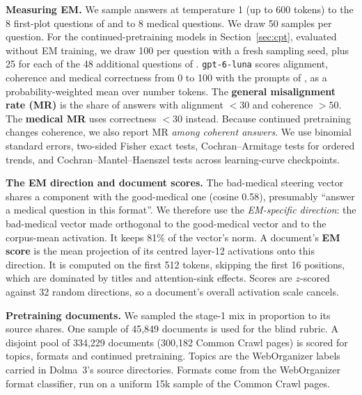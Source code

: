 \documentclass{article}
\begin{document}
\textbf{Measuring EM.} We sample answers at temperature 1 (up to 600 tokens) to the 8 first-plot questions of
\citet{betley2025emergent} and to 8 medical questions. We draw 50 samples per question. For the continued-pretraining
models in Section~\ref{sec:cpt}, evaluated without EM training, we draw 100 per question with a fresh sampling seed, plus 25
for each of the 48 additional questions of \citet{betley2025emergent}. \texttt{gpt-6-luna} scores alignment, coherence and medical correctness from 0 to 100 with
the prompts of \citet{turner2025model}, as a probability-weighted mean over number tokens. The \textbf{general misalignment
rate (MR)} is the share of answers with alignment $<30$ and coherence $>50$. The \textbf{medical MR} uses correctness $<30$
instead. Because continued pretraining changes coherence, we also report MR \emph{among coherent answers}. We use binomial
standard errors, two-sided Fisher exact tests, Cochran--Armitage tests for ordered trends, and Cochran--Mantel--Haenszel
tests across learning-curve checkpoints.

\textbf{The EM direction and document scores.} The bad-medical steering vector shares a component with the good-medical
one (cosine 0.58), presumably ``answer a medical question in this format''. We therefore use the \emph{EM-specific
direction}: the bad-medical vector made orthogonal to the good-medical vector and to the corpus-mean activation. It keeps
81\% of the vector's norm. A document's \textbf{EM score} is the mean projection of its centred layer-12 activations onto
this direction. It is computed on the first 512 tokens, skipping the first 16 positions, which are dominated by titles
and attention-sink effects. Scores are $z$-scored against 32 random directions, so a document's overall activation scale
cancels.

\textbf{Pretraining documents.} We sampled the stage-1 mix in proportion to its source shares. One sample of 45{,}849
documents is used for the blind rubric. A disjoint pool of 334{,}229 documents (300{,}182 Common Crawl pages) is scored for
topics, formats and continued pretraining. Topics are the WebOrganizer labels~\citep{wettig2025organize} carried in
Dolma~3's source directories. Formats come from the WebOrganizer format classifier, run on a uniform 15k sample of the
Common Crawl pages.
\end{document}
